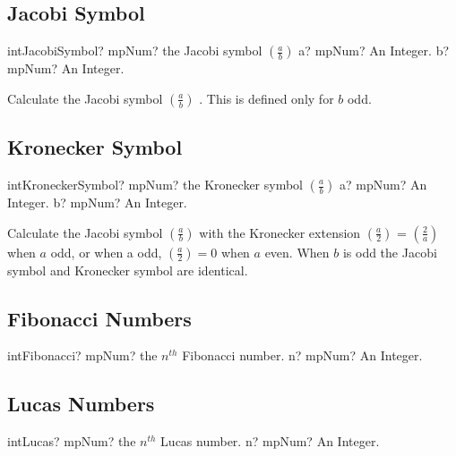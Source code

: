 \subsection{Jacobi Symbol}

\begin{mpFunctionsExtract}
	\mpFunctionTwo
	{intJacobiSymbol? mpNum? the Jacobi symbol $\left(\frac{a}{b}\right)$}
	{a? mpNum? An Integer.}
	{b? mpNum? An Integer.}
\end{mpFunctionsExtract}

\vspace{0.3cm}
Calculate the Jacobi symbol $\left(\frac{a}{b}\right)$ . This is defined only for $b$ odd.





\subsection{Kronecker Symbol}

\begin{mpFunctionsExtract}
	\mpFunctionTwo
	{intKroneckerSymbol? mpNum? the Kronecker symbol $\left(\frac{a}{b}\right)$}
	{a? mpNum? An Integer.}
	{b? mpNum? An Integer.}
\end{mpFunctionsExtract}

\vspace{0.3cm}
Calculate the Jacobi symbol $\left(\frac{a}{b}\right)$ with the Kronecker extension $\left(\frac{a}{2}\right)$ = $\left(\frac{2}{a}\right)$ when $a$ odd, or when a odd,  $\left(\frac{a}{2}\right)=0$ when $a$ even.
When $b$ is odd the Jacobi symbol and Kronecker symbol are identical.





\subsection{Fibonacci Numbers}

\begin{mpFunctionsExtract}
	\mpFunctionOne
	{intFibonacci? mpNum? the $n^{th}$ Fibonacci number.}
	{n? mpNum? An Integer.}
\end{mpFunctionsExtract}




\subsection{Lucas Numbers}

\begin{mpFunctionsExtract}
	\mpFunctionOne
	{intLucas? mpNum? the $n^{th}$ Lucas number.}
	{n? mpNum? An Integer.}
\end{mpFunctionsExtract}







